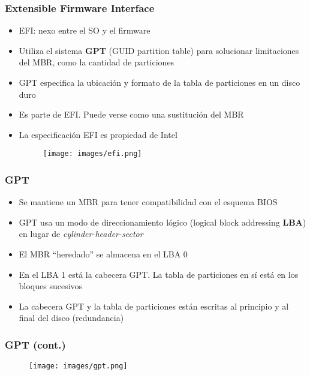 \begin{frame}
	\frametitle{Extensible Firmware Interface}
	\begin{itemize}
		\item EFI: nexo entre el SO y el firmware
		\item Utiliza el sistema \textbf{GPT} (GUID partition table) para solucionar limitaciones del MBR, como la cantidad de particiones
		\item GPT especifica la ubicación y formato de la tabla de particiones en un disco duro
		\item Es parte de EFI. Puede verse como una sustitución del MBR
		\item La especificación EFI es propiedad de Intel
		\begin{figure}
			\centering
			\texttt{[image: images/efi.png]}
		\end{figure}
	\end{itemize}
\end{frame}

\begin{frame}
	\frametitle{GPT}
	\begin{itemize}
		\item Se mantiene un MBR para tener compatibilidad con el esquema BIOS
		\item GPT usa un modo de direccionamiento lógico (logical block addressing \textbf{LBA}) en lugar de \textit{cylinder-header-sector}
		\item El MBR ``heredado'' se almacena en el LBA 0
		\item En el LBA 1 está la cabecera GPT. La tabla de particiones en sí está en los bloques sucesivos
		\item La cabecera GPT y la tabla de particiones están escritas al principio y al final del disco (redundancia)
	\end{itemize}
\end{frame}

\begin{frame}[fragile]
	\frametitle{GPT (cont.)}
	\begin{figure}
		\centering
		\texttt{[image: images/gpt.png]}
	\end{figure}
\end{frame}

